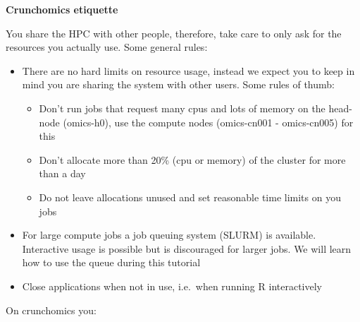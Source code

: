 \documentclass[
  letterpaper,
  DIV=11,
  numbers=noendperiod]{scrreprt}
\providecommand{\tightlist}{%
  \setlength{\itemsep}{0pt}\setlength{\parskip}{0pt}}\usepackage{longtable,booktabs,array}
\begin{document}
\begin{tcolorbox}[enhanced jigsaw, colframe=quarto-callout-important-color-frame, bottomtitle=1mm, breakable, arc=.35mm, coltitle=black, opacityback=0, rightrule=.15mm, opacitybacktitle=0.6, toprule=.15mm, bottomrule=.15mm, titlerule=0mm, toptitle=1mm, title=\textcolor{quarto-callout-important-color}{\faExclamation}\hspace{0.5em}{Important}, colbacktitle=quarto-callout-important-color!10!white, leftrule=.75mm, left=2mm, colback=white]

\textbf{Crunchomics etiquette}

You share the HPC with other people, therefore, take care to only ask
for the resources you actually use. Some general rules:

\begin{itemize}
\tightlist
\item
  There are no hard limits on resource usage, instead we expect you to
  keep in mind you are sharing the system with other users. Some rules
  of thumb:

  \begin{itemize}
  \tightlist
  \item
    Don't run jobs that request many cpus and lots of memory on the
    head-node (omics-h0), use the compute nodes (omics-cn001 -
    omics-cn005) for this
  \item
    Don't allocate more than 20\% (cpu or memory) of the cluster for
    more than a day
  \item
    Do not leave allocations unused and set reasonable time limits on
    you jobs
  \end{itemize}
\item
  For large compute jobs a job queuing system (SLURM) is available.
  Interactive usage is possible but is discouraged for larger jobs. We
  will learn how to use the queue during this tutorial
\item
  Close applications when not in use, i.e.~when running R interactively
\end{itemize}

\end{tcolorbox}

On crunchomics you:
\end{document}
